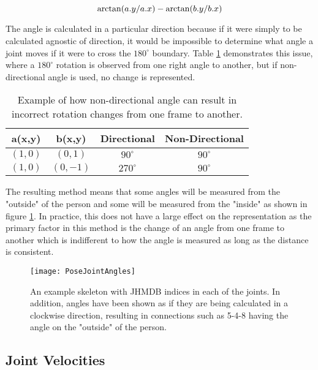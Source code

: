\begin{equation}
	\label{eqn:angle-calculation}
	\centering
	\arctan(a.y/a.x) - \arctan(b.y/b.x)
\end{equation}

The angle is calculated in a particular direction because if it were simply to be calculated agnostic of direction, it would be impossible to determine what angle a joint moves if it were to cross the $180^\circ$ boundary. Table \ref{tab:directed-angle-example} demonstrates this issue, where a $180^\circ$ rotation is observed from one right angle to another, but if non-directional angle is used, no change is represented.

\begin{table}[ht]
	\centering
	\begin{tabular}{||c c c c||} 
		\hline
		\textbf{a(x,y)} & \textbf{b(x,y)} & \textbf{Directional} & \textbf{Non-Directional} \\ [0.5ex] 
		\hline\hline
		$(1,0)$ & $(0,1)$ & $90^\circ$ & $90^\circ$ \\
		\hline
		$(1,0)$ & $(0,-1)$ & $270^\circ$ & $90^\circ$ \\
		\hline
	\end{tabular}
	\caption{Example of how non-directional angle can result in incorrect rotation changes from one frame to another.}
	\label{tab:directed-angle-example}
\end{table}

The resulting method means that some angles will be measured from the "outside" of the person and some will be measured from the "inside" as shown in figure \ref{fig:pose-joint-angles}. In practice, this does not have a large effect on the representation as the primary factor in this method is the change of an angle from one frame to another which is indifferent to how the angle is measured as long as the distance is consistent.

\begin{figure}[ht]
	\texttt{[image: PoseJointAngles]}
	\centering
	\caption{An example skeleton with JHMDB indices in each of the joints. In addition, angles have been shown as if they are being calculated in a clockwise direction, resulting in connections such as 5-4-8 having the angle on the "outside" of the person.}
	\label{fig:pose-joint-angles}
\end{figure}

\subsection{Joint Velocities}
\label{sec:joint-velocities}

